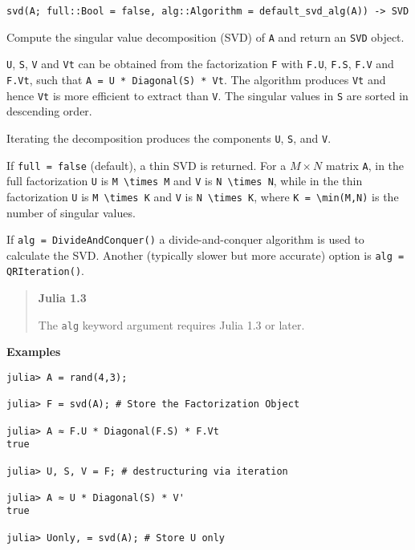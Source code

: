 \begin{adjustwidth}{2em}{0pt}


\begin{verbatim}
svd(A; full::Bool = false, alg::Algorithm = default_svd_alg(A)) -> SVD
\end{verbatim}

Compute the singular value decomposition (SVD) of \texttt{A} and return an \texttt{SVD} object.

\texttt{U}, \texttt{S}, \texttt{V} and \texttt{Vt} can be obtained from the factorization \texttt{F} with \texttt{F.U}, \texttt{F.S}, \texttt{F.V} and \texttt{F.Vt}, such that \texttt{A = U * Diagonal(S) * Vt}. The algorithm produces \texttt{Vt} and hence \texttt{Vt} is more efficient to extract than \texttt{V}. The singular values in \texttt{S} are sorted in descending order.

Iterating the decomposition produces the components \texttt{U}, \texttt{S}, and \texttt{V}.

If \texttt{full = false} (default), a {\textquotedbl}thin{\textquotedbl} SVD is returned. For a  \(M \times N\)  matrix \texttt{A}, in the full factorization \texttt{U} is \texttt{M {\textbackslash}times M} and \texttt{V} is \texttt{N {\textbackslash}times N}, while in the thin factorization \texttt{U} is \texttt{M {\textbackslash}times K} and \texttt{V} is \texttt{N {\textbackslash}times K}, where \texttt{K = {\textbackslash}min(M,N)} is the number of singular values.

If \texttt{alg = DivideAndConquer()} a divide-and-conquer algorithm is used to calculate the SVD. Another (typically slower but more accurate) option is \texttt{alg = QRIteration()}.

\begin{quote}
\textbf{Julia 1.3}

The \texttt{alg} keyword argument requires Julia 1.3 or later.

\end{quote}
\textbf{Examples}


\begin{verbatim}
julia> A = rand(4,3);

julia> F = svd(A); # Store the Factorization Object

julia> A ≈ F.U * Diagonal(F.S) * F.Vt
true

julia> U, S, V = F; # destructuring via iteration

julia> A ≈ U * Diagonal(S) * V'
true

julia> Uonly, = svd(A); # Store U only


\end{verbatim}
\end{adjustwidth}
